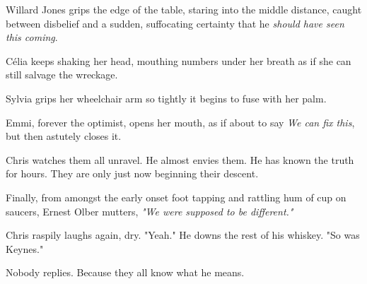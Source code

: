Willard Jones grips the edge of the table, staring into the middle distance, caught between disbelief and a sudden, suffocating certainty that he \textit{should have seen this coming}.

Célia keeps shaking her head, mouthing numbers under her breath as if she can still salvage the wreckage.

Sylvia grips her wheelchair arm so tightly it begins to fuse with her palm.

Emmi, forever the optimist, opens her mouth, as if about to say \textit{We can fix this}, but then astutely closes it.

\smallskip

Chris watches them all unravel. He almost envies them. He has known the truth for hours. They are only just now beginning their descent.

\smallskip

Finally, from amongst the early onset foot tapping and rattling hum of cup on saucers, Ernest Olber mutters, \textit{"We were supposed to be different."}

\smallskip

Chris raspily laughs again, dry. "Yeah." He downs the rest of his whiskey. "So was Keynes."

\smallskip

Nobody replies. Because they all know what he means.

\newpage
